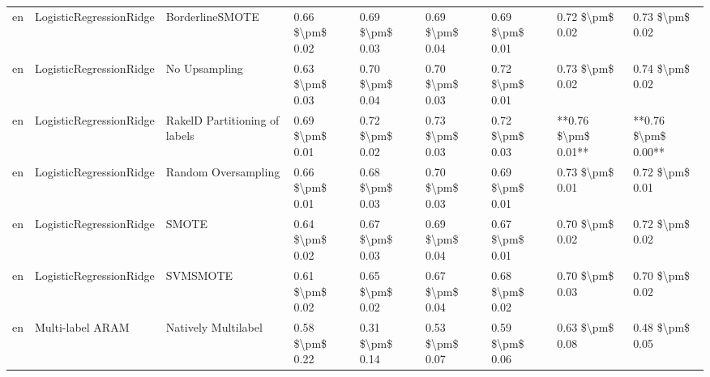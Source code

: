 \begin{tabular}{lllllllll}
      en &         LogisticRegressionRidge &               BorderlineSMOTE &     0.66 \$\textbackslash pm\$ 0.02 &           0.69 \$\textbackslash pm\$ 0.03 &       0.69 \$\textbackslash pm\$ 0.04 &        0.69 \$\textbackslash pm\$ 0.01 &                         0.72 \$\textbackslash pm\$ 0.02 &     0.73 \$\textbackslash pm\$ 0.02 \\
      en &         LogisticRegressionRidge &                 No Upsampling &     0.63 \$\textbackslash pm\$ 0.03 &           0.70 \$\textbackslash pm\$ 0.04 &       0.70 \$\textbackslash pm\$ 0.03 &        0.72 \$\textbackslash pm\$ 0.01 &                         0.73 \$\textbackslash pm\$ 0.02 &     0.74 \$\textbackslash pm\$ 0.02 \\
      en &         LogisticRegressionRidge & RakelD Partitioning of labels &     0.69 \$\textbackslash pm\$ 0.01 &           0.72 \$\textbackslash pm\$ 0.02 &       0.73 \$\textbackslash pm\$ 0.03 &        0.72 \$\textbackslash pm\$ 0.03 &                     **0.76 \$\textbackslash pm\$ 0.01** & **0.76 \$\textbackslash pm\$ 0.00** \\
      en &         LogisticRegressionRidge &           Random Oversampling &     0.66 \$\textbackslash pm\$ 0.01 &           0.68 \$\textbackslash pm\$ 0.03 &       0.70 \$\textbackslash pm\$ 0.03 &        0.69 \$\textbackslash pm\$ 0.01 &                         0.73 \$\textbackslash pm\$ 0.01 &     0.72 \$\textbackslash pm\$ 0.01 \\
      en &         LogisticRegressionRidge &                         SMOTE &     0.64 \$\textbackslash pm\$ 0.02 &           0.67 \$\textbackslash pm\$ 0.03 &       0.69 \$\textbackslash pm\$ 0.04 &        0.67 \$\textbackslash pm\$ 0.01 &                         0.70 \$\textbackslash pm\$ 0.02 &     0.72 \$\textbackslash pm\$ 0.02 \\
      en &         LogisticRegressionRidge &                      SVMSMOTE &     0.61 \$\textbackslash pm\$ 0.02 &           0.65 \$\textbackslash pm\$ 0.02 &       0.67 \$\textbackslash pm\$ 0.04 &        0.68 \$\textbackslash pm\$ 0.02 &                         0.70 \$\textbackslash pm\$ 0.03 &     0.70 \$\textbackslash pm\$ 0.02 \\
      en &                Multi-label ARAM &           Natively Multilabel &     0.58 \$\textbackslash pm\$ 0.22 &           0.31 \$\textbackslash pm\$ 0.14 &       0.53 \$\textbackslash pm\$ 0.07 &        0.59 \$\textbackslash pm\$ 0.06 &                         0.63 \$\textbackslash pm\$ 0.08 &     0.48 \$\textbackslash pm\$ 0.05 \\

\end{tabular}
